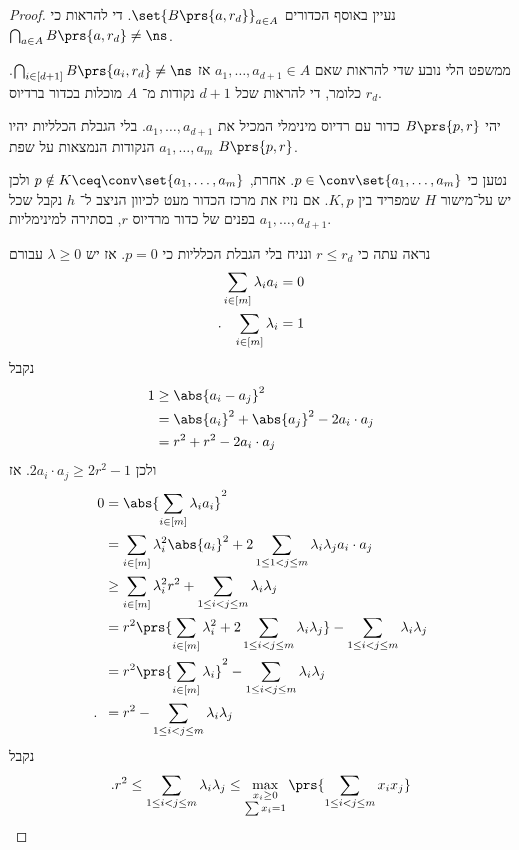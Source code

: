 \documentclass[a4paper,10pt,twoside,openany]{book}
\begin{document}
\begin{proof}
נעיין באוסף הכדורים
$\set{B\prs{a, r_d}}_{a \in A}$.
די להראות כי
$\bigcap_{a \in A} B\prs{a, r_d} \neq \ns$.

ממשפט הלי נובע שדי להראות שאם
$a_1, \ldots, a_{d+1} \in A$
אז
$\bigcap_{i \in [d+1]} B\prs{a_i, r_d} \neq \ns$.
כלומר, די להראות שכל
$d+1$
נקודות מ־%
$A$
מוכלות בכדור ברדיוס
$r_d$.

יהי
$B\prs{p,r}$
כדור עם רדיוס מינימלי המכיל את
$a_1, \ldots, a_{d+1}$.
בלי הגבלת הכלליות יהיו
$a_1, \ldots, a_m$
הנקודות הנמצאות על שפת
$B\prs{p,r}$.

נטען כי
$p \in \conv\set{a_1, \ldots, a_m}$.
אחרת,
$p \notin K \ceq \conv\set{a_1, \ldots, a_m}$
ולכן יש על־מישור
$H$
שמפריד בין
$K,p$.
אם נזיז את מרכז הכדור מעט לכיוון הניצב ל־%
$h$
נקבל שכל $a_1, \ldots, a_{d+1}$ בפנים של כדור מרדיוס
$r$,
בסתירה למינימליות.

נראה עתה כי
$r \leq r_d$
ונניח בלי הגבלת הכלליות כי
$p = 0$.
אז יש
$\lambda \geq 0$
עבורם
\begin{align*}
\sum_{i \in [m]} \lambda_i a_i &= 0 \\
\text{.} \hphantom{la} \sum_{i \in [m]} \lambda_i &= 1
\end{align*}
נקבל
\begin{align*}
1 &\geq \abs{a_i - a_j}^2
\\&= \abs{a_i}^2 + \abs{a_j}^2 - 2 a_i \cdot a_j
\\&= r^2 + r^2 - 2 a_i \cdot a_j
\end{align*}
ולכן
$2 a_i \cdot a_j \geq 2r^2 - 1$.
אז
\begin{align*}
0 &= \abs{\sum_{i \in [m]} \lambda_i a_i}^2
\\&= \sum_{i \in [m]} \lambda_i^2 \abs{a_i}^2 + 2 \sum_{1 \leq 1 < j \leq m} \lambda_i \lambda_j a_i \cdot a_j
\\&\geq \sum_{i \in [m]} \lambda_i^2 r^2 + \sum_{1 \leq i < j \leq m} \lambda_i \lambda_j
\\&= r^2 \prs{\sum_{i \in [m]} \lambda_i^2 + 2 \sum_{1 \leq i < j \leq m} \lambda_i \lambda_j} - \sum_{1 \leq i < j \leq m} \lambda_i \lambda_j
\\&= r^2 \prs{\sum_{i \in [m]} \lambda_i}^2 - \sum_{1 \leq i < j \leq m} \lambda_i \lambda_j 
\\ \text{.} \hphantom{0} &= r^2 - \sum_{1 \leq i < j \leq m} \lambda_i \lambda_j 
\end{align*}
נקבל
\[\text{.} r^2 \leq \sum_{1 \leq i < j \leq m} \lambda_i \lambda_j \leq \max_{\substack{x_i \geq 0 \\ \sum x_i = 1}} \prs{\sum_{1 \leq i < j \leq m} x_i x_j}\]


\end{proof}
\end{document}
